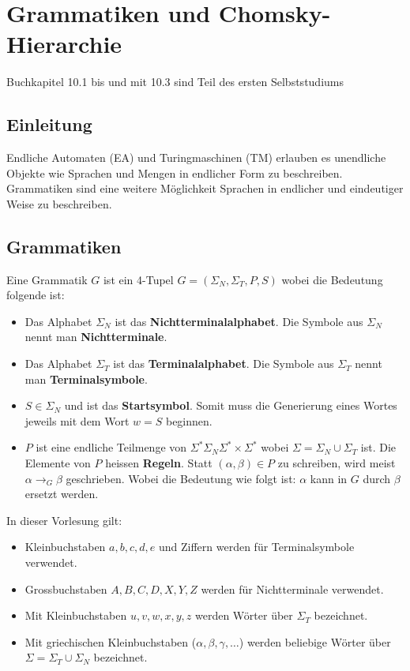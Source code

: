 \chapter{Grammatiken und Chomsky-Hierarchie}
Buchkapitel 10.1 bis und mit 10.3 sind Teil des ersten Selbststudiums

\section{Einleitung}
Endliche Automaten (EA) und Turingmaschinen (TM) erlauben es unendliche Objekte wie Sprachen und Mengen in endlicher Form zu beschreiben. Grammatiken sind eine weitere Möglichkeit Sprachen in endlicher und eindeutiger Weise zu beschreiben.

\section{Grammatiken}


\begin{definition}
Eine Grammatik $G$ ist ein 4-Tupel $G = (\Sigma_N, \Sigma_T, P, S)$ wobei die Bedeutung folgende ist:
\begin{itemize}
  \item Das Alphabet $\Sigma_N$ ist das \textbf{Nichtterminalalphabet}. Die Symbole aus $\Sigma_N$ nennt man \textbf{Nichtterminale}.
  \item Das Alphabet $\Sigma_T$ ist das \textbf{Terminalalphabet}. Die Symbole aus $\Sigma_T$ nennt man \textbf{Terminalsymbole}.
  \item $S \in \Sigma_N$ und ist das \textbf{Startsymbol}. Somit muss die Generierung eines Wortes jeweils mit dem Wort $w = S$ beginnen.
  \item $P$ ist eine endliche Teilmenge von $\Sigma^* \Sigma_N \Sigma^* \times \Sigma^*$ wobei $\Sigma = \Sigma_N \cup \Sigma_T$ ist. Die Elemente von $P$ heissen \textbf{Regeln}. Statt $(\alpha, \beta) \in P$ zu schreiben, wird meist $\alpha \to_G \beta$ geschrieben. Wobei die Bedeutung wie folgt ist: $\alpha$ kann in $G$ durch $\beta$ ersetzt werden.\\
\end{itemize}
\end{definition}

\begin{remark}
In dieser Vorlesung gilt:
\begin{itemize}
  \item Kleinbuchstaben $a, b, c, d, e$ und Ziffern werden für Terminalsymbole verwendet.
  \item Grossbuchstaben $A, B, C, D, X, Y, Z$ werden für Nichtterminale verwendet.
  \item Mit Kleinbuchstaben $u, v, w, x, y, z$ werden Wörter über $\Sigma_T$ bezeichnet.
  \item Mit griechischen Kleinbuchstaben ($\alpha, \beta, \gamma, \ldots$) werden beliebige Wörter über $\Sigma = \Sigma_T \cup \Sigma_N$ bezeichnet.\\
\end{itemize}
\end{remark}

